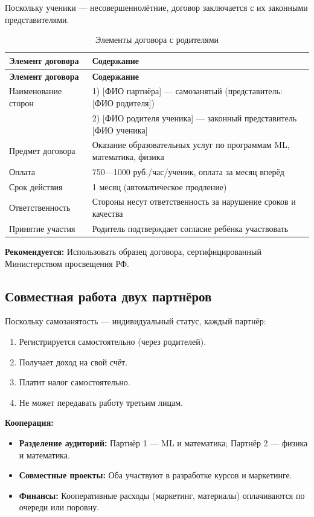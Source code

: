 \documentclass[12pt,a4paper]{article}
\begin{document}
Поскольку ученики --- несовершеннолётние, договор заключается с их законными представителями.

\begin{longtable}{p{4cm}p{6cm}}
\caption{Элементы договора с родителями}
\label{tab:contract_elements} \\
\toprule
\textbf{Элемент договора} & \textbf{Содержание} \\
\midrule
\endfirsthead

\toprule
\textbf{Элемент договора} & \textbf{Содержание} \\
\midrule
\endhead

Наименование сторон & 1) [ФИО партнёра] --- самозанятый (представитель: [ФИО родителя]) \\
& 2) [ФИО родителя ученика] --- законный представитель [ФИО ученика] \\
Предмет договора & Оказание образовательных услуг по программам ML, математика, физика \\
Оплата & 750---1000 руб./час/ученик, оплата за месяц вперёд \\
Срок действия & 1 месяц (автоматическое продление) \\
Ответственность & Стороны несут ответственность за нарушение сроков и качества \\
Принятие участия & Родитель подтверждает согласие ребёнка участвовать \\
\bottomrule
\end{longtable}

\textbf{Рекомендуется:} Использовать образец договора, сертифицированный Министерством просвещения РФ.

\subsection{Совместная работа двух партнёров}

Поскольку самозанятость --- индивидуальный статус, каждый партнёр:

\begin{enumerate}
  \item Регистрируется самостоятельно (через родителей).
  \item Получает доход на свой счёт.
  \item Платит налог самостоятельно.
  \item Не может передавать работу третьим лицам.
\end{enumerate}

\textbf{Кооперация:}
\begin{itemize}
  \item \textbf{Разделение аудиторий:} Партнёр 1 --- ML и математика; Партнёр 2 --- физика и математика.
  \item \textbf{Совместные проекты:} Оба участвуют в разработке курсов и маркетинге.
  \item \textbf{Финансы:} Кооперативные расходы (маркетинг, материалы) оплачиваются по очереди или поровну.
\end{itemize}
\end{document}
